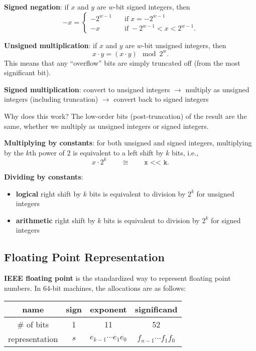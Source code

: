 \documentclass{article}
\theoremstyle{definition} %
\newcommand{\nline}{\vspace{\baselineskip}}
\begin{document}
\begin{flushleft}
\nline

\textbf{Signed negation}: if $x$ and $y$ are $w$-bit signed integers, then
\[
-x = \begin{cases}
-2^{w-1} \quad &\text{if} \; x = -2^{w-1} \\
-x \quad &\text{if} \; -2^{w-1} < x < 2^{w-1}.
\end{cases}
\]

\textbf{Unsigned multiplication}: if $x$ and $y$ are $w$-bit unsigned integers, then
\[
x \cdot y = (x \cdot y) \mod 2^w.
\]
This means that any ``overflow'' bits are simply truncated off (from the most significant bit).

\nline

\textbf{Signed multiplication}: convert to unsigned integers $\to$ multiply as unsigned integers (including truncation) $\to$ convert back to signed integers

\nline

Why does this work? The low-order bits (post-truncation) of the result are the same, whether we multiply as unsigned integers or signed integers.

\nline

\textbf{Multiplying by constants}: for both unsigned and signed integers, multiplying by the $k$th power of $2$ is equivalent to a left shift by $k$ bits, i.e.,
\[
x \cdot 2^k \qquad \cong \qquad \texttt{x << k}.
\]

\textbf{Dividing by constants}:

\begin{itemize}
    \item \textbf{logical} right shift by $k$ bits is equivalent to division by $2^k$ for unsigned integers
    \item \textbf{arithmetic} right shift by $k$ bits is equivalent to division by $2^k$ for signed integers
\end{itemize}

\subsection{Floating Point Representation}

\textbf{IEEE floating point} is the standardized way to represent floating point numbers. In $64$-bit machines, the allocations are as follows:

\begin{center}

\begin{tabular}{|c|c|c|c|}
    \hline
    name & sign & exponent & significand \\
    \hline
    \# of bits & 1 & 11 & 52 \\
    \hline
    representation & $s$ & $e_{k-1}\cdots e_1 e_0$ & $f_{n-1} \cdots f_1 f_0$ \\
    \hline
\end{tabular}


\end{center}
\end{flushleft}
\end{document}
